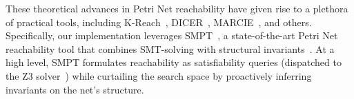 These theoretical advances in Petri Net reachability have given rise to a plethora of practical tools, including K-Reach~\cite{DiLa20}, DICER~\cite{XiZhLi21}, MARCIE~\cite{HeRoSc13}, and others. 
%
Specifically, our implementation leverages SMPT~\cite{AmDa23}, a state-of-the-art Petri Net reachability tool that combines SMT-solving with structural invariants~\cite{AmBeDa21, AmDaHu22}. At a high level, SMPT formulates reachability as satisfiability queries (dispatched to the Z3 solver~\cite{DeBj08}) while curtailing the search space by proactively inferring invariants on the net's structure.
%


 
 






